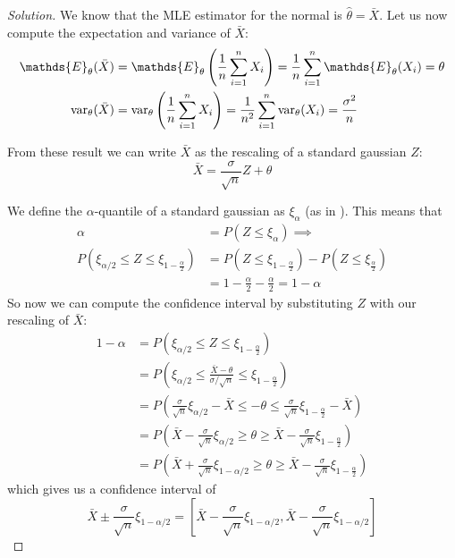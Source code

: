 \documentclass[12pt]{extarticle}
\renewcommand{\var}{{\operatorfont var}}
\newcommand{\E}{\mathds{E}}
\begin{document}
\begin{proof}[Solution]
    We know that the MLE estimator for the normal is $\hat \theta = \bar X$.
    Let us now compute the expectation and variance of $\bar X$:
    \begin{align}
        \E_{\theta} (\bar X)   & = \E_\theta \left( \oneover{n} \sum_{i = 1}^n X_i \right) = \oneover n \sum_{i = 1}^n \E_\theta(X_i) = \theta                    \\
        \var_{\theta} (\bar X) & = \var_\theta \left( \oneover{n} \sum_{i = 1}^n X_i \right) = \oneover{n^2} \sum_{i = 1}^n \var_\theta(X_i) = \frac{\sigma^2}{n}
    \end{align}

    From these result we can write $\bar X$ as the rescaling of a standard gaussian $Z$:
    \begin{equation}
        \bar X = \frac{\sigma}{\sqrt{n}} Z + \theta
    \end{equation}

    We define the $\alpha$-quantile of a standard gaussian as $\xi_\alpha$ (as in ).
    This means that
    \begin{align}
        \alpha                                                 & = P(Z \leq \xi_\alpha) \implies                                        \\
        P(\xi_{\alpha/2} \leq Z \leq \xi_{1-\frac{\alpha}{2}}) & = P(Z \leq \xi_{1-\frac{\alpha}{2}}) -P(Z \leq \xi_{\frac{\alpha}{2}}) \\
                                                               & = 1-\frac{\alpha}{2} -\frac{\alpha}{2} = 1- \alpha
    \end{align}
    So now we can compute the confidence interval by substituting $Z$ with our rescaling of $\bar X$:
    \begin{align}
        1 - \alpha & = P(\xi_{\alpha/2} \leq Z \leq \xi_{1-\frac{\alpha}{2}})                                                                                 \\
                   & = P\left(\xi_{\alpha/2} \leq \frac{\bar X - \theta}{\sigma / \sqrt n} \leq \xi_{1-\frac{\alpha}{2}}\right)                               \\
                   & = P\left(\frac{\sigma}{\sqrt n}\xi_{\alpha/2} - \bar X \leq - \theta \leq \frac{\sigma}{\sqrt n}\xi_{1-\frac{\alpha}{2}} - \bar X\right) \\
                   & = P\left(\bar X - \frac{\sigma}{\sqrt n}\xi_{\alpha/2} \geq \theta \geq \bar X -\frac{\sigma}{\sqrt n}\xi_{1-\frac{\alpha}{2}}\right)    \\
                   & = P\left(\bar X + \frac{\sigma}{\sqrt n}\xi_{1-\alpha/2} \geq \theta \geq \bar X -\frac{\sigma}{\sqrt n}\xi_{1-\frac{\alpha}{2}}\right)
    \end{align}
    which gives us a confidence interval of
    \begin{equation}
        \bar X \pm \frac{\sigma}{\sqrt n}\xi_{1-\alpha/2} = [\bar X - \frac{\sigma}{\sqrt n}\xi_{1-\alpha/2}, \bar X - \frac{\sigma}{\sqrt n}\xi_{1-\alpha/2}]
    \end{equation}
\end{proof}
\end{document}
